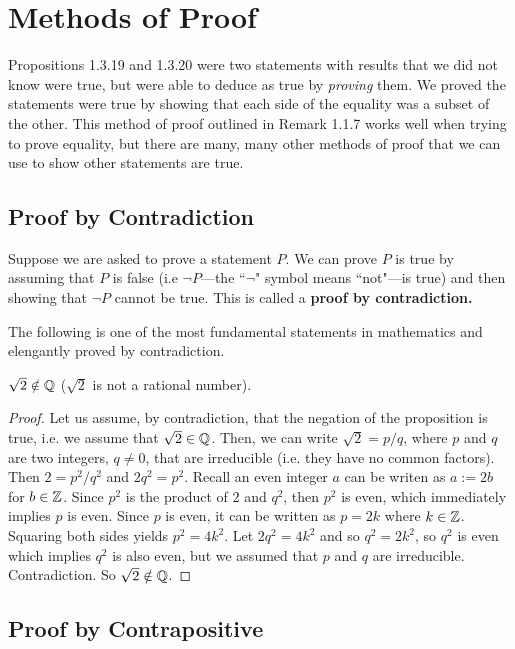 \section{Methods of Proof}

Propositions 1.3.19 and 1.3.20 were two statements with results that we did not know were true, but were able to deduce as true by \textit{proving} them. We proved the statements were true by showing that each side of the equality was a subset of the other. This method of proof outlined in Remark 1.1.7 works well when trying to prove equality, but there are many, many other methods of proof that we can use to show other statements are true.

\subsection{Proof by Contradiction}

Suppose we are asked to prove a statement $P$. We can prove $P$ is true by assuming that $P$ is false (i.e $\neg P$---the ``$\neg$" symbol means ``not"---is true) and then showing that $\neg P$ cannot be true. This is called a \textbf{proof by contradiction.}

The following is one of the most fundamental statements in mathematics and elengantly proved by contradiction.

\begin{propbox}
   $\sqrt{2} \notin \mathbb{Q}$ ($\sqrt{2}$ is not a rational number).
\end{propbox}

\begin{proof}
   Let us assume, by contradiction, that the negation of the proposition is true, i.e. we assume that $\sqrt{2} \in \mathbb{Q}$. Then, we can write $\sqrt{2} = p/q$, where $p$ and $q$ are two integers, $q \neq 0$, that are irreducible (i.e. they have no common factors). Then $2 = p^2/q^2$ and $2q^2 = p^2$. Recall an even integer $a$ can be writen as $a := 2b$ for $b \in \mathbb{Z}$. Since $p^2$ is the product of $2$ and $q^2$, then $p^2$ is even, which immediately implies $p$ is even. Since $p$ is even, it can be written as $p = 2k$ where $k \in \mathbb{Z}$. Squaring both sides yields $p^2 = 4k^2$. Let $2q^2 = 4k^2$ and so $q^2 = 2k^2$, so $q^2$ is even which implies $q^2$ is also even, but we assumed that $p$ and $q$ are irreducible. Contradiction. So $\sqrt{2} \notin \mathbb{Q}$. 
\end{proof}

\subsection{Proof by Contrapositive}

